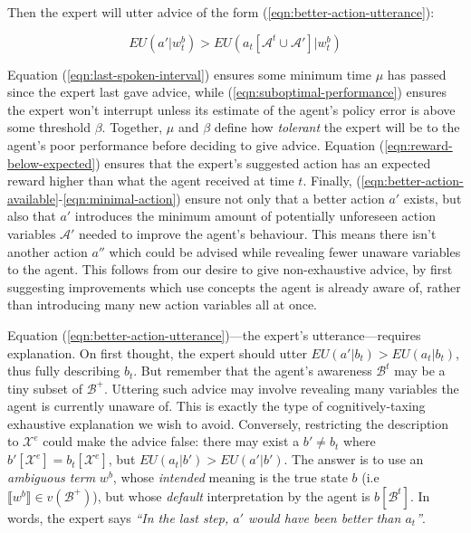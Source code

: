 \documentclass{article}
\begin{document}
	Then the expert will utter advice of the form (\ref{eqn:better-action-utterance}):
	
	\begin{equation}
	\label{eqn:better-action-utterance}
	EU(a' | w^b_t) > EU(a_t[\mathcal{A}^t \cup \mathcal{A}'] | w^b_t)
	\end{equation}
	
	Equation (\ref{eqn:last-spoken-interval}) ensures some minimum time $\mu$ has passed since the expert last gave advice, while (\ref{eqn:suboptimal-performance}) ensures the expert won't interrupt unless its estimate of the agent's policy error is above some threshold $\beta$. Together, $\mu$ and $\beta$ define how \emph{tolerant} the expert will be to the agent's poor performance before deciding to give advice. Equation (\ref{eqn:reward-below-expected}) ensures that the expert's suggested action has an expected reward higher than what the agent received at time $t$. Finally, (\ref{eqn:better-action-available}-\ref{eqn:minimal-action}) ensure not only that a better action $a'$ exists,  but also that $a'$ introduces the minimum amount of potentially unforeseen action variables $\mathcal{A}'$ needed to improve the agent's behaviour. This means there isn't another action $a''$ which could be advised while revealing fewer unaware variables to the agent. This follows from our desire to give non-exhaustive advice, by first suggesting improvements which use concepts the agent is already aware of, rather than introducing many new action variables all at once.
	
	Equation (\ref{eqn:better-action-utterance})---the expert's utterance---requires explanation. On first thought, the expert should utter $EU(a' | b_t) > EU(a_{t} | b_t)$, thus fully describing $b_t$. But remember that the agent's awareness $\mathcal{B}^t$ may be a tiny subset of $\mathcal{B}^+$. Uttering such advice may involve revealing many variables the agent is currently unaware of. This is exactly the type of cognitively-taxing exhaustive explanation we wish to avoid. Conversely, restricting the description to $\mathcal{X}^e$ could make the advice false: there may exist a $b' \neq b_t$ where $b'[\mathcal{X}^e] = b_t[\mathcal{X}^e]$, but $EU(a_t | b') > EU(a' | b')$. The answer is to use an \emph{ambiguous term} $w^b$, whose \emph{intended} meaning is the true state $b$ (i.e $\llbracket w^b \rrbracket \in v(\mathcal{B}^+)$), but whose \emph{default} interpretation by the agent is $b[\mathcal{B}^t]$. In words, the expert says \emph{``In the last step, $a'$ would have been better than $a_t$''}.
	
\end{document}
